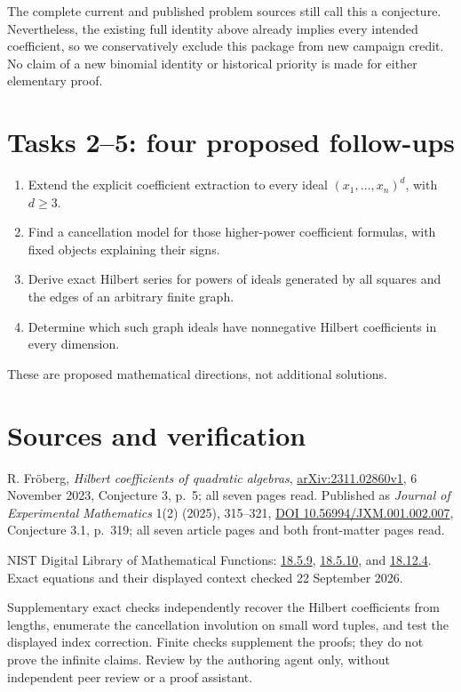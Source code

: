 \documentclass[11pt]{article}
\begin{document}
The complete current and published problem sources still call this
a conjecture. Nevertheless, the existing full identity above already
implies every intended coefficient, so we conservatively exclude
this package from new campaign credit. No claim of a new binomial
identity or historical priority is made for either elementary proof.

\section*{Tasks 2--5: four proposed follow-ups}
\begin{enumerate}[label=\textbf{Task \arabic*:},start=2,leftmargin=*]
\item Extend the explicit coefficient extraction to every ideal
\((x_1,\ldots,x_n)^d\), with \(d\geq3\).
\item Find a cancellation model for those higher-power coefficient
formulas, with fixed objects explaining their signs.
\item Derive exact Hilbert series for powers of ideals generated by
all squares and the edges of an arbitrary finite graph.
\item Determine which such graph ideals have nonnegative Hilbert
coefficients in every dimension.
\end{enumerate}
These are proposed mathematical directions, not additional solutions.

\section*{Sources and verification}
R. Fr\"oberg, \emph{Hilbert coefficients of quadratic algebras},
\href{https://arxiv.org/abs/2311.02860}{arXiv:2311.02860v1},
6 November 2023, Conjecture 3, p.~5; all seven pages read.
Published as \emph{Journal of Experimental Mathematics} 1(2) (2025),
315--321, \href{https://doi.org/10.56994/JXM.001.002.007}{DOI
10.56994/JXM.001.002.007}, Conjecture 3.1, p.~319; all seven article
pages and both front-matter pages read.

NIST Digital Library of Mathematical Functions:
\href{https://dlmf.nist.gov/18.5.E9}{18.5.9},
\href{https://dlmf.nist.gov/18.5.E10}{18.5.10}, and
\href{https://dlmf.nist.gov/18.12.E4}{18.12.4}.
Exact equations and their displayed context checked 22 September 2026.

Supplementary exact checks independently recover the Hilbert
coefficients from lengths, enumerate the cancellation involution on
small word tuples, and test the displayed index correction.
Finite checks supplement the proofs; they do not prove the infinite
claims. Review by the authoring agent only, without independent peer
review or a proof assistant.
\end{document}
